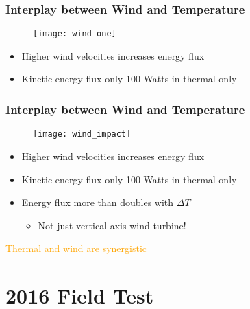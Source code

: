\documentclass[mathserif]{beamer}
\begin{document}
%
%
%
\begin{frame}
 \frametitle{Interplay between Wind and Temperature}

 \begin{figure}[htb]
  \centering
  \texttt{[image: wind\_one]}
 \end{figure}

 \begin{itemize}
  \item Higher wind velocities increases energy flux
  \item Kinetic energy flux only 100 Watts in thermal-only
 \end{itemize} 
\end{frame}

%
%
%
\begin{frame}
 \frametitle{Interplay between Wind and Temperature}

 \begin{figure}[htb]
  \centering
    \texttt{[image: wind\_impact]}
 \end{figure}

  \begin{itemize}
   \item Higher wind velocities increases energy flux
   \item Kinetic energy flux only 100 Watts in thermal-only
   \item Energy flux more than doubles with $\Delta T$
   \begin{itemize}
    \item Not just vertical axis wind turbine!
   \end{itemize} 
  \end{itemize}
\centering
 \textcolor{orange}{Thermal and wind are synergistic}
\end{frame}
 


\section{2016 Field Test}
%
%

\end{document}
